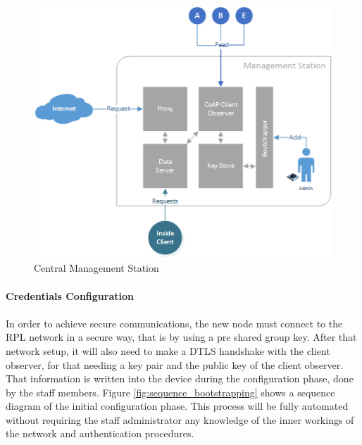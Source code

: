 \begin{figure}[h]
  \centering
  \includegraphics[width=0.8\linewidth]{figures/White_Box_Model.png}
  \caption{Central Management Station}
  \label{fig:core_components}
\end{figure}

\paragraph{\textbf{Credentials Configuration}}
\paragraph{}

In order to achieve secure communications, the new node must connect to the RPL network in a secure way, that is by using a pre shared group key. After that network setup, it will also need to make a DTLS handshake with the client observer, for that needing a key pair and the public key of the client observer. That information is written into the device during the configuration phase, done by the staff members. Figure \ref{fig:sequence_bootstrapping} shows a sequence diagram of the initial configuration phase. This process will be fully automated without requiring the staff administrator any knowledge of the inner workings of the network and authentication procedures.

